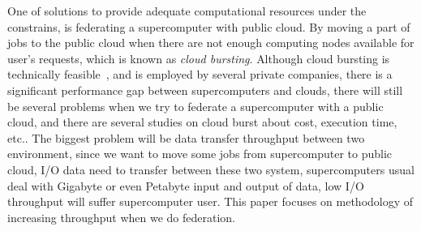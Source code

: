 One of solutions to provide adequate computational resources under the constrains, is federating a supercomputer with public cloud.
By moving a part of jobs to the public cloud when there are not enough
computing nodes available for user's requests, which is known as \emph{cloud bursting}.
\cite{Optimizing_Service_Level_Agreements_for_Autonomic_Cloud_Bursting_Schedulers, A_Framework_for_Data-Intensive_Computing_with_Cloud_Bursting}
Although cloud bursting is technically feasible~\cite{Eucalyptus,stratos,Seagull}, 
and is employed by several private companies, 
there is a significant performance gap between supercomputers and clouds, 
there will still be several problems when we try to federate a supercomputer with a public cloud, 
and there are several studies on cloud burst about cost\cite{Seagull}, execution time\cite{time_and_cost}, etc..
The biggest problem will be data transfer throughput between two environment, 
since we want to move some jobs from supercomputer to public cloud, I/O data need to transfer between these two system, supercomputers usual deal with Gigabyte or even Petabyte input and output of data, 
low I/O throughput will suffer supercomputer user. This paper focuses on methodology 
of increasing throughput when we do federation.

